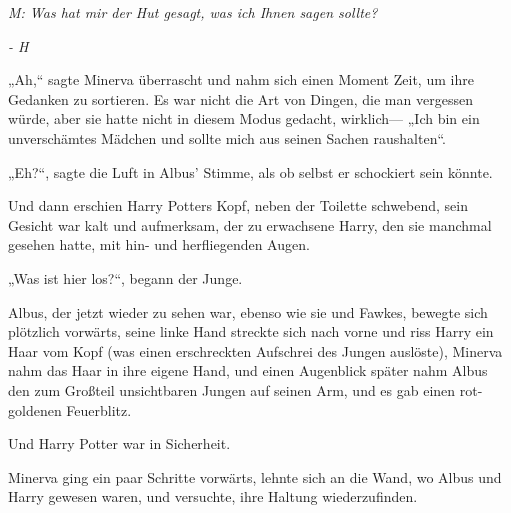 \emph{M: Was hat mir der Hut gesagt, was ich Ihnen sagen sollte?}

\emph{- H}

„Ah,“ sagte Minerva überrascht und nahm sich einen Moment Zeit, um ihre Gedanken zu sortieren. Es war nicht die Art von Dingen, die man vergessen würde, aber sie hatte nicht in diesem Modus gedacht, wirklich— „Ich bin ein unverschämtes Mädchen und sollte mich aus seinen Sachen raushalten“.

„Eh?“, sagte die Luft in Albus' Stimme, als ob selbst er schockiert sein könnte.

Und dann erschien Harry Potters Kopf, neben der Toilette schwebend, sein Gesicht war kalt und aufmerksam, der zu erwachsene Harry, den sie manchmal gesehen hatte, mit hin- und herfliegenden Augen.

„Was ist hier los?“, begann der Junge.

Albus, der jetzt wieder zu sehen war, ebenso wie sie und Fawkes, bewegte sich plötzlich vorwärts, seine linke Hand streckte sich nach vorne und riss Harry ein Haar vom Kopf (was einen erschreckten Aufschrei des Jungen auslöste), Minerva nahm das Haar in ihre eigene Hand, und einen Augenblick später nahm Albus den zum Großteil unsichtbaren Jungen auf seinen Arm, und es gab einen rot-goldenen Feuerblitz.

Und Harry Potter war in Sicherheit.

Minerva ging ein paar Schritte vorwärts, lehnte sich an die Wand, wo Albus und Harry gewesen waren, und versuchte, ihre Haltung wiederzufinden.


